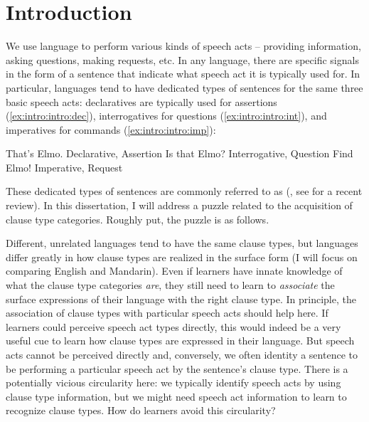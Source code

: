 

\chapter{Introduction}
\label{chap:introduction}
We use language to perform various kinds of speech acts -- providing information, asking questions, making requests, etc. In any language, there are specific signals in the form of a sentence that indicate what speech act it is typically used for. In particular, languages tend to have dedicated types of sentences for the same three basic speech acts: declaratives are typically used for assertions (\ref{ex:intro:intro:dec}), interrogatives for questions (\ref{ex:intro:intro:int}), and imperatives for commands (\ref{ex:intro:intro:imp}):

\bxl \label{ex:intro:intro:dec}
That's Elmo. \hfill Declarative, Assertion
\ex\label{ex:intro:intro:int} Is that Elmo? \hfill Interrogative, Question
\ex\label{ex:intro:intro:imp} Find Elmo! \hfill Imperative, Request
\exl
\eex


These dedicated types of sentences are commonly referred to as  (\citealt{sz1985speechact, konig2007, aikhenvald2016, portner2018}, see \cite{konig2020} for a recent review). In this dissertation, I will address a puzzle related to the acquisition of clause type categories. Roughly put, the puzzle is as follows.%

Different, unrelated languages tend to have the same clause types, but languages differ greatly in how clause types are realized in the surface form (I will focus on comparing English and Mandarin). Even if learners have innate knowledge of what the clause type categories \emph{are}, they still need to learn to \emph{associate} the surface expressions of their language with the right clause type. In principle, the association of clause types with particular speech acts should help here. If learners could perceive speech act types directly, this would indeed be a very useful cue to learn how clause types are expressed in their language. But speech acts cannot be perceived directly and, conversely, we often identity a sentence to be performing a particular speech act by the sentence's clause type. There is a potentially vicious circularity here: we typically identify speech acts by using clause type information, but we might need speech act information to learn to recognize clause types. How do learners avoid this circularity?

